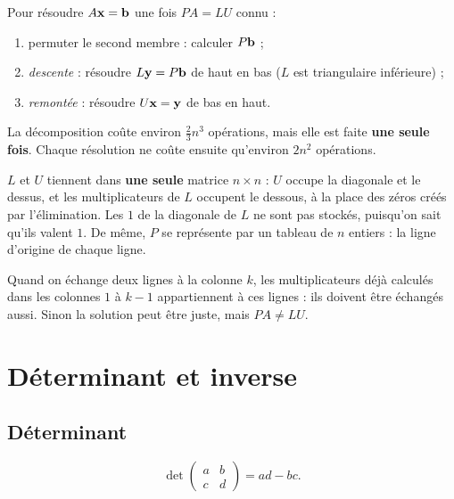 \begin{methodbox}
Pour résoudre $A\mathbf{x} = \mathbf{b}$ une fois
$PA = LU$ connu :
\begin{enumerate}
    \item permuter le second membre : calculer
          $P\mathbf{b}$ ;
    \item \emph{descente} : résoudre
          $L\mathbf{y} = P\mathbf{b}$ de haut en bas
          ($L$ est triangulaire inférieure) ;
    \item \emph{remontée} : résoudre
          $U\mathbf{x} = \mathbf{y}$ de bas en haut.
\end{enumerate}
La décomposition coûte environ $\frac{2}{3} n^3$
opérations, mais elle est faite \textbf{une seule
fois}. Chaque résolution ne coûte ensuite qu'environ
$2n^2$ opérations.
\end{methodbox}

\begin{remark}
$L$ et $U$ tiennent dans \textbf{une seule} matrice
$n \times n$ : $U$ occupe la diagonale et le dessus,
et les multiplicateurs de $L$ occupent le dessous, à
la place des zéros créés par l'élimination. Les $1$
de la diagonale de $L$ ne sont pas stockés, puisqu'on
sait qu'ils valent $1$. De même, $P$ se représente par
un tableau de $n$ entiers : la ligne d'origine de
chaque ligne.
\end{remark}

\begin{importantbox}
Quand on échange deux lignes à la colonne $k$, les
multiplicateurs déjà calculés dans les colonnes
$1$ à $k - 1$ appartiennent à ces lignes : ils
doivent être échangés aussi. Sinon la solution peut
être juste, mais $PA \neq LU$.
\end{importantbox}

\section{Déterminant et inverse}

\subsection{Déterminant}

\begin{definition}
\[
    \det \begin{pmatrix} a & b \\ c & d \end{pmatrix}
    = ad - bc.
\]
\end{definition}

